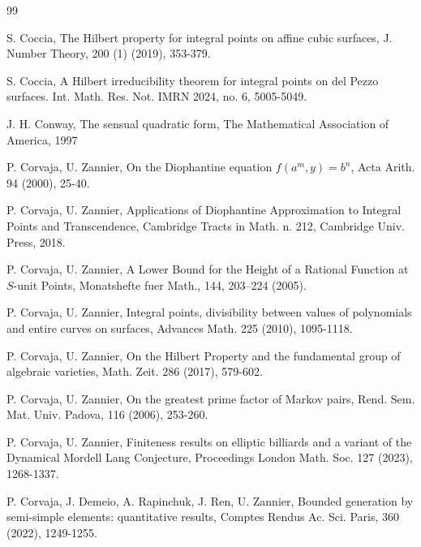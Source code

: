 \documentclass[leqno,12pt]{article} %
\theoremstyle{plain} %
\theoremstyle{definition} %
\begin{document}
\begin{thebibliography}{99}
\smallskip




\smallskip

  S. Coccia, The Hilbert property for integral points on affine cubic surfaces, J. Number Theory, 200 (1) (2019), 353-379.
\smallskip

 S. Coccia, A Hilbert irreducibility theorem for integral points on del Pezzo surfaces. Int. Math. Res. Not. IMRN 2024, no. 6, 5005-5049.
\smallskip



 J. H. Conway, The sensual quadratic form, The Mathematical Association of America, 1997
\smallskip

 P. Corvaja, U. Zannier, On the Diophantine equation $f(a^m,y)=b^n$, Acta Arith. 94 (2000), 25-40.
\smallskip


 P. Corvaja, U. Zannier, Applications of Diophantine Approximation to Integral Points and Transcendence, Cambridge Tracts in Math. n. 212, Cambridge Univ. Press, 2018.

\smallskip

  P. Corvaja, U. Zannier, A Lower Bound for the Height of a Rational Function at $S$-unit Points, Monatshefte fuer Math., 144, 203--224 (2005).

\smallskip

    P. Corvaja, U. Zannier, Integral points, divisibility between values of polynomials and entire curves on surfaces, Advances Math. 225 (2010), 1095-1118.
 
 \smallskip

   P. Corvaja, U. Zannier,  On the Hilbert Property and the fundamental group of algebraic varieties, Math. Zeit. {  286} (2017), 579-602.

\smallskip

   P. Corvaja, U. Zannier, On the greatest prime factor of Markov pairs, Rend. Sem. Mat. Univ. Padova, 116 (2006), 253-260.

\smallskip

 P. Corvaja, U. Zannier, Finiteness results on elliptic billiards and a variant of the Dynamical Mordell Lang Conjecture, Proceedings London Math. Soc. {  127} (2023), 1268-1337.
\bigskip

   P. Corvaja, J. Demeio, A. Rapinchuk, J. Ren, U. Zannier, Bounded generation by semi-simple elements: quantitative results, Comptes Rendus Ac. Sci. Paris, 360 (2022), 1249-1255.\smallskip


\end{thebibliography}
\end{document}
